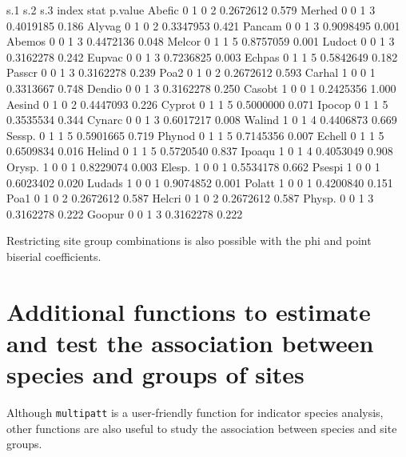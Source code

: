 \documentclass[11pt,a4paper]{article}
\begin{document}
\begin{Schunk}
\begin{Soutput}
       s.1 s.2 s.3 index      stat p.value
Abefic   0   1   0     2 0.2672612   0.579
Merhed   0   0   1     3 0.4019185   0.186
Alyvag   0   1   0     2 0.3347953   0.421
Pancam   0   0   1     3 0.9098495   0.001
Abemos   0   0   1     3 0.4472136   0.048
Melcor   0   1   1     5 0.8757059   0.001
Ludoct   0   0   1     3 0.3162278   0.242
Eupvac   0   0   1     3 0.7236825   0.003
Echpas   0   1   1     5 0.5842649   0.182
Passcr   0   0   1     3 0.3162278   0.239
Poa2     0   1   0     2 0.2672612   0.593
Carhal   1   0   0     1 0.3313667   0.748
Dendio   0   0   1     3 0.3162278   0.250
Casobt   1   0   0     1 0.2425356   1.000
Aesind   0   1   0     2 0.4447093   0.226
Cyprot   0   1   1     5 0.5000000   0.071
Ipocop   0   1   1     5 0.3535534   0.344
Cynarc   0   0   1     3 0.6017217   0.008
Walind   1   0   1     4 0.4406873   0.669
Sessp.   0   1   1     5 0.5901665   0.719
Phynod   0   1   1     5 0.7145356   0.007
Echell   0   1   1     5 0.6509834   0.016
Helind   0   1   1     5 0.5720540   0.837
Ipoaqu   1   0   1     4 0.4053049   0.908
Orysp.   1   0   0     1 0.8229074   0.003
Elesp.   1   0   0     1 0.5534178   0.662
Psespi   1   0   0     1 0.6023402   0.020
Ludads   1   0   0     1 0.9074852   0.001
Polatt   1   0   0     1 0.4200840   0.151
Poa1     0   1   0     2 0.2672612   0.587
Helcri   0   1   0     2 0.2672612   0.587
Physp.   0   0   1     3 0.3162278   0.222
Goopur   0   0   1     3 0.3162278   0.222
\end{Soutput}
\end{Schunk}
Restricting site group combinations is also possible with the phi and point biserial coefficients. 

\section{Additional functions to estimate and test the association between species and groups of sites}
Although \texttt{multipatt} is a user-friendly function for indicator species analysis, other functions are also useful to study the association between species and site groups. 
\end{document}
